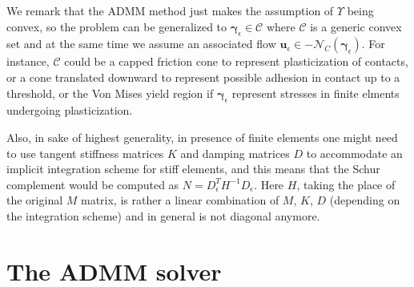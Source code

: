 \documentclass{svproc}
\newcommand{\vect}[1]{\bm{#1}}
\begin{document}

We remark that the ADMM method just makes the assumption of $\Upsilon$ being convex, so the problem can be generalized to $\vect{\gamma}_\epsilon \in \mathcal{C}$ where $\mathcal{C}$ is a generic convex set and at the same time we assume an associated 
flow $\vect{u}_\epsilon \in - \mathcal{N}_{C}(\vect{\gamma}_\epsilon)$. For instance, $\mathcal{C}$ could be a capped friction cone to represent plasticization of contacts, or a cone translated downward to represent possible adhesion in contact up to a threshold, or the Von Mises yield region if $\vect{\gamma}_\epsilon$ represent stresses in finite elments undergoing plasticization. 

Also, in sake of highest generality, in presence of finite elements one might need to use tangent stiffness matrices $K$ and damping matrices $D$ to accommodate an implicit integration scheme for stiff elements, and this means that the Schur complement would be computed as $N=D_{\epsilon}^T H^{-1} D_{\epsilon}$. Here $H$, taking the place of the original $M$ matrix, is rather a linear combination of $M$, $K$, $D$ (depending on the integration scheme) and in general is not diagonal anymore. 



\section{The ADMM solver}
\end{document}
